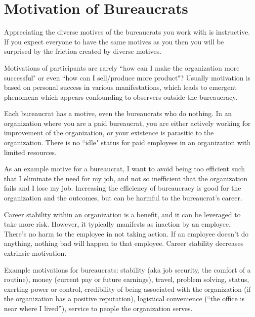\section{Motivation of Bureaucrats\label{sec:motivations}}

Appreciating the diverse motives of the bureaucrats you work with is instructive. If you expect everyone to have the same motives as you then you will be surprised by the friction created by diverse motives. 

Motivations of participants are rarely ``how can I make the organization more successful" or even ``how can I sell/produce more product"? Usually motivation is based on personal success in various manifestations, which leads to emergent phenomena which appears confounding to observers outside the bureaucracy. 



Each bureaucrat has a motive, even the bureaucrats who do nothing. 
In an organization where you are a paid bureaucrat, you are either actively working for improvement of the organization, or your existence is parasitic to the organization. There is no ``idle" status for paid employees in an organization with limited resources.

As an example motive for a bureaucrat, I want to avoid being too efficient such that I eliminate the need for my job, and not so inefficient that the organization fails and I lose my job. Increasing the efficiency of bureaucracy is good for the organization and the outcomes, but can be harmful to the bureaucrat's career.

Career stability within an organization is a benefit, and it can be leveraged to take more risk. However, it typically manifests as inaction by an employee. There's no harm to the employee in not taking action. If an employee doesn't do anything, nothing bad will happen to that employee. Career stability decreases extrinsic motivation.


Example motivations for bureaucrats: 
stability (aka job security, the comfort of a routine),
money (current pay or future earnings), 
travel, 
problem solving, 
status, 
exerting power or control, 
credibility of being associated with the organization (if the organization has a positive reputation), 
logistical convenience (``the office is near where I lived''), 
service to people the organization serves.



